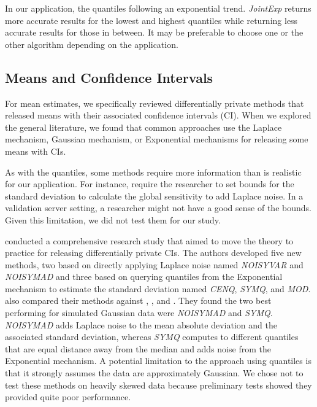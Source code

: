 In our application, the quantiles following an exponential trend. \textit{JointExp} returns more accurate results for the lowest and highest quantiles while returning less accurate results for those in between. It may be preferable to choose one or the other algorithm depending on the application.

\subsection{Means and Confidence Intervals}
For mean estimates, we specifically reviewed differentially private methods that released means with their associated confidence intervals (CI). When we explored the general literature, we found that common approaches use the Laplace mechanism, Gaussian mechanism, or Exponential mechanisms for releasing some means with CIs.

As with the quantiles, some methods require more information than is realistic for our application. For instance, \citet{karwa2017finite, bowen2020comparative, d2015differential, biswas2020coinpress} require the researcher to set bounds for the standard deviation to calculate the global sensitivity to add Laplace noise. In a validation server setting, a researcher might not have a good sense of the bounds. Given this limitation, we did not test them for our study.

\citet{du2020differentially} conducted a comprehensive research study that aimed to move the theory to practice for releasing differentially private CIs. The authors developed five new methods, two based on directly applying Laplace noise named \textit{NOISYVAR} and \textit{NOISYMAD} and three based on querying quantiles from the Exponential mechanism  to estimate the standard deviation named \textit{CENQ}, \textit{SYMQ}, and \textit{MOD}. \citet{du2020differentially} also compared their methods against \citet{karwa2017finite}, \citet{d2015differential}, and \citet{brawner2018bootstrap}. They found the two best performing for simulated Gaussian data were \textit{NOISYMAD} and \textit{SYMQ}. \textit{NOISYMAD} adds Laplace noise to the mean absolute deviation and the associated standard deviation, whereas \textit{SYMQ} computes to different quantiles that are equal distance away from the median and adds noise from the Exponential mechanism. A potential limitation to the approach using quantiles is that it strongly assumes the data are approximately Gaussian. We chose not to test these methods on heavily skewed data because preliminary tests showed they provided quite poor performance.

